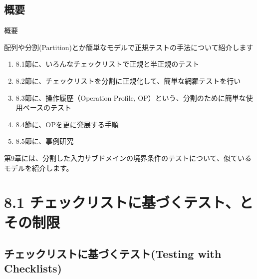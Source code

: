 \subsection{概要}
\begin{frame}{概要}


配列や分割(Partition)とか簡単なモデルで正規テストの手法について紹介します

\begin{enumerate}
\item 8.1節に、いろんなチェックリストで正規と半正規のテスト
\item 8.2節に、チェックリストを分割に正規化して、簡単な網羅テストを行い 
\item 8.3節に、操作履歴（Operation Profile, OP）という、分割のために簡単な使用ベースのテスト
\item 8.4節に、OPを更に発展する手順
\item 8.5節に、事例研究 
\end{enumerate}

第9章には、分割した入力サブドメインの境界条件のテストについて、似ているモデルを紹介します。

\end{frame}

\section{8.1 チェックリストに基づくテスト、とその制限}
\subsection{チェックリストに基づくテスト(Testing with Checklists)}

